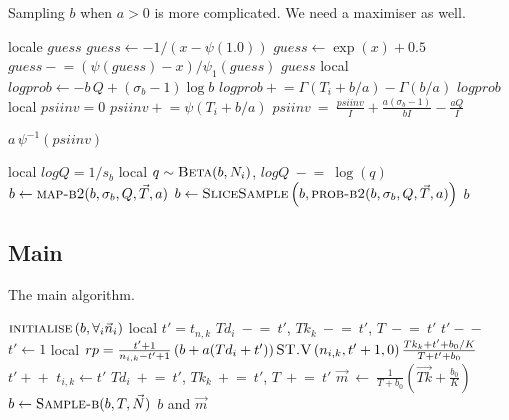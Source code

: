 \documentclass{article}
\newcommand{\doubleminus}{\!-\!\!-}
\newcommand{\doubleplus}{\!+\!\!+}
\newcommand{\plusequal}{\!+\!\!=}
\newcommand{\minusequal}{\!-\!\!=}
\begin{document}
\noindent
Sampling $b$ when $a>0$ is more complicated.
We need a maximiser as well.
\begin{algorithmic}[5]
  \State locale $guess$
    \State $guess \leftarrow -1 / (x - \psi(1.0))$
    \Else
    \State $guess \leftarrow \exp(x) + 0.5$
    \EndIf
    \State $guess \minusequal (\psi(guess) - x)/ \psi_1(guess)$
    \EndFor
   $guess$
  \EndFunction
     \State local $logprob \leftarrow -b\, Q + (\sigma_b-1) \log b$
         \State $logprob \plusequal \Gamma(T_i+b/a) - \Gamma(b/a)$
     \EndFor
      $logprob$
  \EndFunction
    \State local $psiinv =0$
    \State $psiinv \plusequal \psi(T_i+b/a)$
    \EndFor
     \State $psiinv~=~ \frac{psiinv}{I}+
              \frac{a(\sigma_b-1)}{bI} - \frac{aQ}{I}$

      $a\,\psi^{-1}(psiinv)$
    \EndFunction
\end{algorithmic}
\begin{algorithmic}[5]
    \State local $logQ=1/s_b$
    \State local $q \sim \mbox{\sc Beta}(b,N_i)$, $logQ ~\minusequal~ \log(q)$
    \EndFor
    \State $b  \leftarrow \mbox{\sc map-b2}(b,\sigma_b, Q, \vec{T},a)$
    \State $b \leftarrow \mbox{\sc SliceSample}\left(b,\mbox{\sc prob-b2}(b,\sigma_b, Q, \vec{T},a)\right)$
       $b$
    \EndFunction
\end{algorithmic}


\subsection{Main}
\noindent
The main algorithm.
\begin{algorithmic}[5]
    \medskip
    \State  $\mbox{\sc initialise}\left(b,\forall_i \vec{n}_i\right)$
      \State local $t'=t_{n,k}$
      \State $Td_i ~\minusequal~ t'$, $Tk_k ~\minusequal~ t'$, $T ~\minusequal~ t'$
       \State $t'\doubleminus$ \EndIf
       \State $t' \leftarrow 1$ \Else
      \State local $rp = \frac{t'+1}{n_{i,k}-t'+1}\, (b+a(Td_i+t')) \,
              \mbox{\sc ST.V}\left(n_{i,k},t'+1,0\right) \frac{Tk_k+t'+b_0/K}{T+t'+b_0}$
         \State $t'\doubleplus$ \EndIf
        \EndIf
      \EndFor
      \State $t_{i,k}\leftarrow t'$      
      \State $Td_i ~\plusequal~ t'$, $Tk_k ~\plusequal~ t'$, $T ~\plusequal~ t'$
      \EndIf
      \EndFor
    \EndFor
    \State $\vec{m} ~\leftarrow ~ \frac{1}{T+b_0} \left( \vec{Tk} + \frac{b_0}{K}\right)$
    \State $b \leftarrow  \mbox{\sc Sample-b}(b,T,\vec{N})$
      $b$ and $\vec{m}$
\end{algorithmic}
\end{document}
